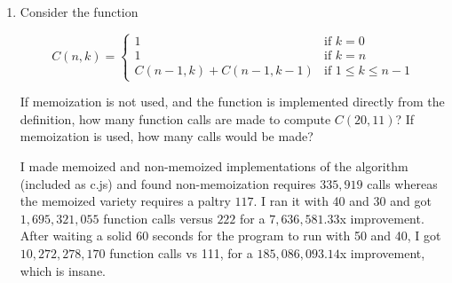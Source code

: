 \documentclass[a4paper,12pt]{article}
\begin{document}
\begin{enumerate}
\item Consider the function

\[
  C(n,k) = \begin{cases} 
              1 & \text{if } k = 0\\
              1 & \text{if } k = n\\
              C(n - 1, k) + C(n - 1, k -1) & \text{if } 1 \leq k \leq n - 1
           \end{cases}
\]

If memoization is not used, and the function is implemented directly from the definition, how many function calls are made to compute $C(20,11)$? If memoization is used, how many calls would be made?

\vspace{5 mm}

I made memoized and non-memoized implementations of the algorithm (included as c.js) and found non-memoization requires $335,919$ calls whereas the memoized variety requires a paltry $117$. I ran it with 40 and 30 and got $1,695,321,055$ function calls versus $222$ for a $7,636,581.33$x improvement. After waiting a solid 60 seconds for the program to run with 50 and 40, I got $10,272,278,170$ function calls vs 111, for a $185,086,093.14$x improvement, which is insane.

\end{enumerate}
\end{document}
